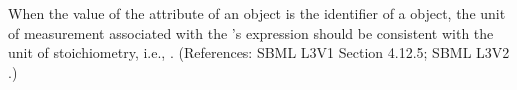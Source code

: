 When the value of the attribute  of an \EventAssignment
object is the identifier of a \SpeciesReference object, the unit of
measurement associated with the \EventAssignment's  expression
should be consistent with the unit of stoichiometry, i.e.,
.  (References: SBML L3V1 Section 4.12.5; SBML L3V2
.)
